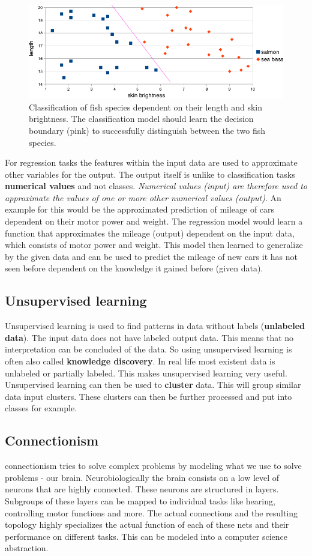 \documentclass[jou,apacite]{apa6}
\begin{document}
\begin{figure}[!htb]
\centering
\includegraphics[width=.45\textwidth]{classification-fish.png}
\caption[Classification of fish]{Classification of fish species dependent on their length and skin brightness. The classification model should learn the decision boundary (pink) to successfully distinguish between the two fish species.}
\label{fig:fish-classification}
\end{figure}

For regression tasks the features within the input data are used to approximate other variables for the output. The output itself is unlike to classification tasks \textbf{numerical values} and not classes. \textit{Numerical values (input) are therefore used to approximate the values of one or more other numerical values (output)}. An example for this would be the approximated prediction of mileage of cars dependent on their motor power and weight. The regression model would learn a function that approximates the mileage (output) dependent on the input data, which consists of motor power and weight. This model then learned to generalize by the given data and can be used to predict the mileage of new cars it has not seen before dependent on the knowledge it gained before (given data).

\subsection{Unsupervised learning}
Unsupervised learning is used to find patterns in data without labels (\textbf{unlabeled data}). The input data does not have labeled output data. This means that no interpretation can be concluded of the data. So using unsupervised learning is often also called \textbf{knowledge discovery}. In real life most existent data is unlabeled or partially labeled. This makes unsupervised learning very useful. Unsupervised learning can then be used to \textbf{cluster} data. This will group similar data input clusters. These clusters can then be further processed and put into classes for example.

\subsection{Connectionism}
\gls{connectionism} tries to solve complex problems by modeling what we use to solve problems - our brain. Neurobiologically the brain consists on a low level of neurons that are highly connected. These neurons are structured in layers. Subgroups of these layers can be mapped to individual tasks like hearing, controlling motor functions and more. The actual connections and the resulting topology highly specializes the actual function of each of these nets and their performance on different tasks. This can be modeled into a computer science abstraction.
\end{document}
